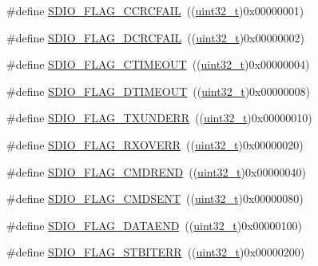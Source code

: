 \begin{DoxyCompactItemize}
\item 
\#define \hyperlink{group___s_d_i_o___flags_ga8ff1f3960378e05ec3c949940e1c49d0}{S\+D\+I\+O\+\_\+\+F\+L\+A\+G\+\_\+\+C\+C\+R\+C\+F\+A\+IL}~((\hyperlink{_p_e___types_8h_a33594304e786b158f3fb30289278f5af}{uint32\+\_\+t})0x00000001)
\item 
\#define \hyperlink{group___s_d_i_o___flags_ga6de936ea11cbc79444d519268ad9f9bd}{S\+D\+I\+O\+\_\+\+F\+L\+A\+G\+\_\+\+D\+C\+R\+C\+F\+A\+IL}~((\hyperlink{_p_e___types_8h_a33594304e786b158f3fb30289278f5af}{uint32\+\_\+t})0x00000002)
\item 
\#define \hyperlink{group___s_d_i_o___flags_ga7389f64ff6cfa4f459bf852b5faede30}{S\+D\+I\+O\+\_\+\+F\+L\+A\+G\+\_\+\+C\+T\+I\+M\+E\+O\+UT}~((\hyperlink{_p_e___types_8h_a33594304e786b158f3fb30289278f5af}{uint32\+\_\+t})0x00000004)
\item 
\#define \hyperlink{group___s_d_i_o___flags_ga2d2fd219dd9fea522862195ab9568345}{S\+D\+I\+O\+\_\+\+F\+L\+A\+G\+\_\+\+D\+T\+I\+M\+E\+O\+UT}~((\hyperlink{_p_e___types_8h_a33594304e786b158f3fb30289278f5af}{uint32\+\_\+t})0x00000008)
\item 
\#define \hyperlink{group___s_d_i_o___flags_gabd18f8e5d5387a38dccbe1bf28ae5dbc}{S\+D\+I\+O\+\_\+\+F\+L\+A\+G\+\_\+\+T\+X\+U\+N\+D\+E\+RR}~((\hyperlink{_p_e___types_8h_a33594304e786b158f3fb30289278f5af}{uint32\+\_\+t})0x00000010)
\item 
\#define \hyperlink{group___s_d_i_o___flags_gad49d60039e40d31b734cfacf90caa84f}{S\+D\+I\+O\+\_\+\+F\+L\+A\+G\+\_\+\+R\+X\+O\+V\+E\+RR}~((\hyperlink{_p_e___types_8h_a33594304e786b158f3fb30289278f5af}{uint32\+\_\+t})0x00000020)
\item 
\#define \hyperlink{group___s_d_i_o___flags_ga083531db75a1e4c05c47578763d53af1}{S\+D\+I\+O\+\_\+\+F\+L\+A\+G\+\_\+\+C\+M\+D\+R\+E\+ND}~((\hyperlink{_p_e___types_8h_a33594304e786b158f3fb30289278f5af}{uint32\+\_\+t})0x00000040)
\item 
\#define \hyperlink{group___s_d_i_o___flags_gac81f3837aac17a6aed7310a8ea460f17}{S\+D\+I\+O\+\_\+\+F\+L\+A\+G\+\_\+\+C\+M\+D\+S\+E\+NT}~((\hyperlink{_p_e___types_8h_a33594304e786b158f3fb30289278f5af}{uint32\+\_\+t})0x00000080)
\item 
\#define \hyperlink{group___s_d_i_o___flags_gaaacb2f6207c149e05f8bdd70e5d49926}{S\+D\+I\+O\+\_\+\+F\+L\+A\+G\+\_\+\+D\+A\+T\+A\+E\+ND}~((\hyperlink{_p_e___types_8h_a33594304e786b158f3fb30289278f5af}{uint32\+\_\+t})0x00000100)
\item 
\#define \hyperlink{group___s_d_i_o___flags_gae83f7cb3fa1183898131f3de47c2333e}{S\+D\+I\+O\+\_\+\+F\+L\+A\+G\+\_\+\+S\+T\+B\+I\+T\+E\+RR}~((\hyperlink{_p_e___types_8h_a33594304e786b158f3fb30289278f5af}{uint32\+\_\+t})0x00000200)

\end{DoxyCompactItemize}
